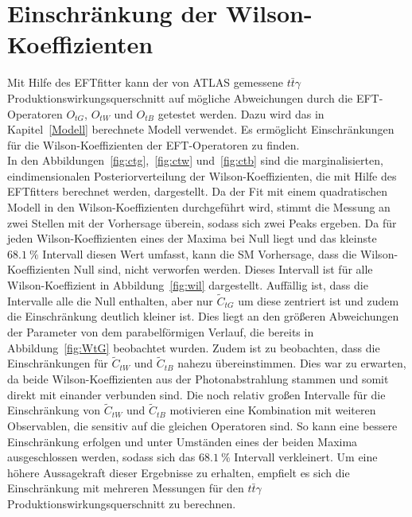 \section{Einschränkung der Wilson-Koeffizienten}
Mit Hilfe des EFTfitter kann der von ATLAS gemessene $t\bar{t}\gamma$ Produktionswirkungsquerschnitt auf mögliche Abweichungen durch die EFT-Operatoren $O_{tG}$, $O_{tW}$ und $O_{tB}$ getestet werden. Dazu wird das in Kapitel~\ref{Modell} berechnete Modell verwendet. Es ermöglicht Einschränkungen für die Wilson-Koeffizienten der EFT-Operatoren zu finden.\\
In den Abbildungen~\ref{fig:ctg},~\ref{fig:ctw} und~\ref{fig:ctb} sind die marginalisierten, eindimensionalen Posteriorverteilung der Wilson-Koeffizienten, die mit Hilfe des EFTfitters berechnet werden, dargestellt.
Da der Fit mit einem quadratischen Modell in den Wilson-Koeffizienten durchgeführt wird, stimmt die Messung an zwei Stellen mit der Vorhersage überein, sodass sich zwei Peaks ergeben.
Da für jeden Wilson-Koeffizienten eines der Maxima bei Null liegt und das kleinste $\SI{68.1}{\percent}$ Intervall diesen Wert umfasst, kann die SM Vorhersage, dass die Wilson-Koeffizienten Null sind, nicht verworfen werden.
Dieses Intervall ist für alle Wilson-Koeffizient in Abbildung~\ref{fig:wil} dargestellt. Auffällig ist, dass die Intervalle alle die Null enthalten, aber nur $\tilde{C}_{tG}$ um diese zentriert ist und zudem die Einschränkung deutlich kleiner ist.
Dies liegt an den größeren Abweichungen der Parameter von dem parabelförmigen Verlauf, die bereits in Abbildung~\ref{fig:WtG} beobachtet wurden.
Zudem ist zu beobachten, dass die Einschränkungen für $\tilde{C}_{tW}$ und $\tilde{C}_{tB}$ nahezu übereinstimmen.
Dies war zu erwarten, da beide Wilson-Koeffizienten aus der Photonabstrahlung stammen und somit direkt mit einander verbunden sind.
Die noch relativ großen Intervalle für die Einschränkung von $\tilde{C}_{tW}$ und $\tilde{C}_{tB}$ motivieren eine Kombination mit weiteren Observablen, die sensitiv auf die gleichen Operatoren sind. So kann eine bessere Einschränkung erfolgen und unter Umständen eines der beiden Maxima ausgeschlossen werden, sodass sich das $\SI{68.1}{\percent}$ Intervall verkleinert.
Um eine höhere Aussagekraft dieser Ergebnisse zu erhalten, empfielt es sich die Einschränkung mit mehreren Messungen für den $t\bar{t}\gamma$ Produktionswirkungsquerschnitt zu berechnen.
